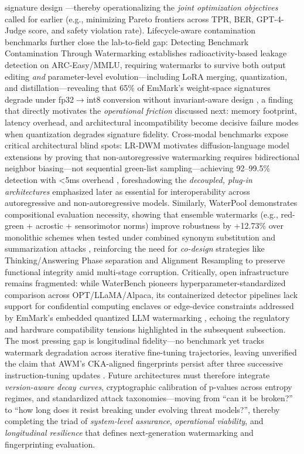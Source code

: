 \documentclass[11pt,a4paper]{article}
\begin{document}
signature design \cite{arxiv:2310.00646,arxiv:2403.07283}---thereby operationalizing the \emph{joint optimization objectives} called for earlier (e.g., minimizing Pareto frontiers across TPR, BER, GPT-4-Judge score, and safety violation rate). Lifecycle-aware contamination benchmarks further close the lab-to-field gap: Detecting Benchmark Contamination Through Watermarking establishes radioactivity-based leakage detection on ARC-Easy/MMLU, requiring watermarks to survive both output editing \emph{and} parameter-level evolution---including LoRA merging, quantization, and distillation---revealing that 65\% of EmMark's weight-space signatures degrade under fp32$\rightarrow$int8 conversion without invariant-aware design \cite{doi:10.1109/sds66131.2025.00024}, a finding that directly motivates the \emph{operational friction} discussed next: memory footprint, latency overhead, and architectural incompatibility become decisive failure modes when quantization degrades signature fidelity. Cross-modal benchmarks expose critical architectural blind spots: LR-DWM motivates diffusion-language model extensions by proving that non-autoregressive watermarking requires bidirectional neighbor biasing---not sequential green-list sampling---achieving 92--99.5\% detection with <5ms overhead \cite{arxiv:2403.07283}, foreshadowing the \emph{decoupled, plug-in architectures} emphasized later as essential for interoperability across autoregressive and non-autoregressive models. Similarly, WaterPool demonstrates compositional evaluation necessity, showing that ensemble watermarks (e.g., red-green + acrostic + sensorimotor norms) improve robustness by +12.73\% over monolithic schemes when tested under combined synonym substitution and summarization attacks \cite{arxiv:2405.13517}, reinforcing the need for \emph{co-design} strategies like Thinking/Answering Phase separation \cite{doi:10.1609/aaai.v36i10.21415} and Alignment Resampling \cite{doi:10.14722/ndss.2026.230138} to preserve functional integrity amid multi-stage corruption. Critically, open infrastructure remains fragmented: while WaterBench pioneers hyperparameter-standardized comparison across OPT/LLaMA/Alpaca, its containerized detector pipelines lack support for confidential computing enclaves or edge-device constraints addressed by EmMark's embedded quantized LLM watermarking \cite{arxiv:2405.13517,doi:10.1109/sds66131.2025.00024}, echoing the regulatory and hardware compatibility tensions highlighted in the subsequent subsection. The most pressing gap is longitudinal fidelity---no benchmark yet tracks watermark degradation across iterative fine-tuning trajectories, leaving unverified the claim that AWM's CKA-aligned fingerprints persist after three successive instruction-tuning updates \cite{doi:10.1145/3639477.3639720}. Future architectures must therefore integrate \emph{version-aware decay curves}, cryptographic calibration of p-values across entropy regimes, and standardized attack taxonomies---moving from ``can it be broken?'' to ``how long does it resist breaking under evolving threat models?'', thereby completing the triad of \emph{system-level assurance}, \emph{operational viability}, and \emph{longitudinal resilience} that defines next-generation watermarking and fingerprinting evaluation.
\end{document}
